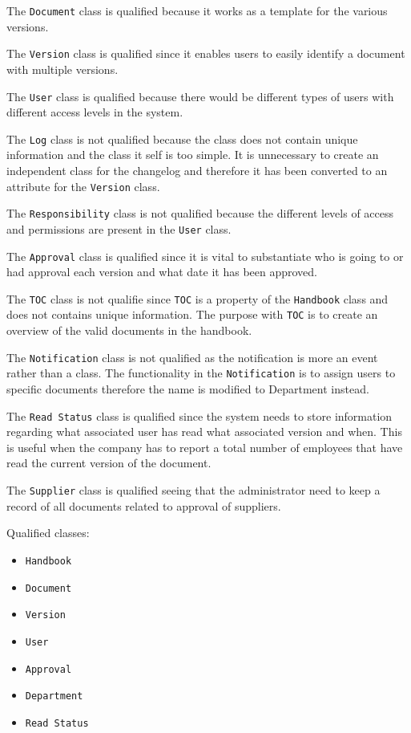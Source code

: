 The \texttt{Document} class is qualified because it works as a template for the various versions. 

The \texttt{Version} class is qualified since it enables users to easily identify a document with multiple versions.

The \texttt{User} class is qualified because there would be different types of users with different access levels in the system. 

The \texttt{Log} class is not qualified because the class does not contain unique information and the class it self is too simple. It is unnecessary to create an independent class for the changelog and therefore it has been converted to an attribute for the \texttt{Version} class.
 
The \texttt{Responsibility} class is not qualified because the different levels of access and permissions are present in the \texttt{User} class.

The \texttt{Approval} class is qualified since it is vital to substantiate who is going to or had approval each version and what date it has been approved. 

The \texttt{TOC} class is not qualifie since \texttt{TOC} is a property of the \texttt{Handbook} class and does not contains unique information. The purpose with \texttt{TOC} is to create an overview of the valid documents in the handbook.

The \texttt{Notification} class is not qualified as the notification is more an event rather than a class. The functionality in the \texttt{Notification} is to assign users to specific documents therefore the name is modified to Department instead.

The \texttt{Read Status} class is qualified since the system needs to store information regarding what associated user has read what associated version and when. This is useful when the company has to report a total number of employees that have read the current version of the document.

The \texttt{Supplier} class is qualified seeing that the administrator need to keep a record of all documents related to approval of suppliers. %

Qualified classes:
\begin{itemize}
  \item \texttt{Handbook}
  \item \texttt{Document}
  \item \texttt{Version}
  \item \texttt{User}
  \item \texttt{Approval}
  \item \texttt{Department}
  \item \texttt{Read Status}
\end{itemize}


